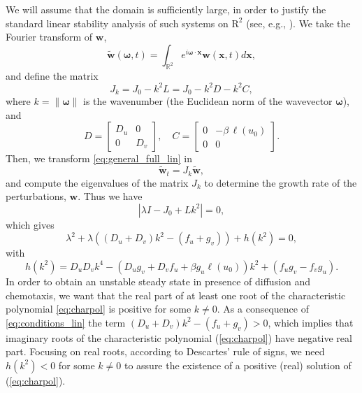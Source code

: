 \documentclass{article}
\newcommand{\jac}{J_{k}}
\begin{document}
{We will assume that the domain is sufficiently large, in order to justify the standard linear stability analysis of such systems on $\mathrm{R}^2$ (see, e.g., \cite{Murray_book2}). We take the Fourier transform of $\mathbf{w}$,
  $$  \widetilde{\mathbf{w}}({\boldsymbol\omega},t) = \int_{\mathbb{R}^2} e^{i {\boldsymbol\omega} \cdot \mathbf{x}} \mathbf{w}(\mathbf{x},t) d\mathbf{x},
  $$
and define the matrix
\begin{equation}
    \label{eq:j_matrix}
    \jac = J_{0} - k^2 L = J_{0} - k^2 D - k^2 C,
\end{equation}
where $k = \| {\boldsymbol\omega}\|$ {is the wavenumber (the Euclidean norm of the wavevector $\boldsymbol{\omega}$), and}
$$
    D = \left [ \begin{array}{cc}
         D_u & 0 \\
         0 & D_v
    \end{array}
    \right], \quad C = \left [ \begin{array}{cc}
         0 & -\beta \, \ell(u_0) \\
         0 & 0
    \end{array}
    \right].
$$
Then, we transform \eqref{eq:general_full_lin} in
\begin{equation}  \label{eq:general_linear}
\widetilde{\mathbf{w}}_t
  = \jac \widetilde{\mathbf{w}},
  \end{equation}
and compute the eigenvalues of the matrix $\jac$ {to determine the growth rate of the perturbations, $\mathbf{w}$}. Thus we have
    $$
    \left| \lambda I - J_{0} + L k^2 \right| = 0,
    $$
which gives
 \begin{equation}
 \label{eq:charpol}
    \lambda^2 + \lambda \left( \left(D_u+D_v \right)k^2 - \left(f_u+g_v\right) \right) + h(k^2) = 0,
 \end{equation}
with
   \label{eq:h}
  $$
    h(k^2) =  D_u D_v k^4  - \left(D_u g_v + D_v f_u + \beta g_u \ell(u_0) \right) k^2 + \left(f_u g_v - f_v g_u \right).
    $$
In order to obtain an unstable steady state in presence of diffusion and chemotaxis, we want that the real part of at least one root of the characteristic polynomial \eqref{eq:charpol} is positive for some $k \neq 0$. As a consequence of \eqref{eq:conditions_lin} the term    $\left(D_u + D_v \right) k^2 - \left(f_u + g_v \right) > 0$, {which implies} that imaginary roots of the characteristic polynomial (\ref{eq:charpol}) have negative real part. Focusing on real roots, according to Descartes' rule of signs, we need \(h(k^2) < 0\) for some \(k \neq 0\) to assure the existence of a positive (real) solution of (\ref{eq:charpol}).
}
\end{document}

